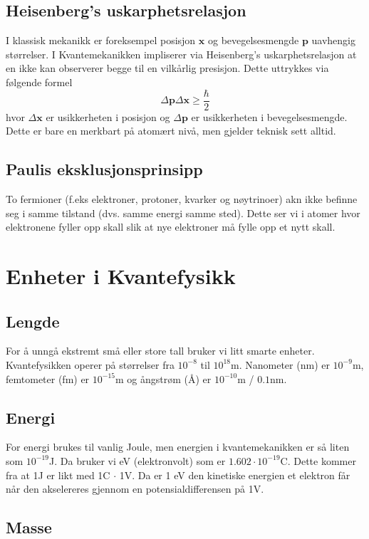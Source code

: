 \subsection{Heisenberg's uskarphetsrelasjon}
I klassisk mekanikk er foreksempel posisjon $ \mathbf{x} $ og bevegelsesmengde $ \mathbf{p} $ uavhengig størrelser. I Kvantemekanikken impliserer via Heisenberg's uskarphetsrelasjon at en ikke kan observerer begge til en vilkårlig presisjon. Dette uttrykkes via følgende formel
\[
Δ \mathbf{p} Δ\mathbf{x} \geq \frac{ℏ}{2}
\]
hvor $ Δ\mathbf{x} $ er usikkerheten i posisjon og $ Δ\mathbf{p} 
$ er usikkerheten i bevegelsesmengde. Dette er bare en merkbart på atomært nivå, men gjelder teknisk sett alltid. 

\subsection{Paulis eksklusjonsprinsipp}
To fermioner (f.eks elektroner, protoner, kvarker og nøytrinoer) akn ikke befinne seg i samme tilstand (dvs. samme energi samme sted). Dette ser vi i atomer hvor elektronene fyller opp skall slik at nye elektroner må fylle opp et nytt skall. 



\section{Enheter i Kvantefysikk}
\subsection{Lengde}
For å unngå ekstremt små eller store tall bruker vi litt smarte enheter. Kvantefysikken operer på størrelser fra $ 10^{-8} $ til $ 10^{18} $m. Nanometer (nm) er $ 10^{-9} $m, femtometer (fm) er $ 10^{-15} $m og ångstrøm (Å) er $ 10^{-10} $m / $ 0.1 $nm.

\subsection{Energi}
For energi brukes til vanlig Joule, men energien i kvantemekanikken er så liten som $ 10^{-19} $J. Da bruker vi eV (elektronvolt) som er $ 1.602 \cdot 10^{-19} $C. Dette kommer fra at 1J er likt med 1C $\cdot$ 1V. Da er 1 eV den kinetiske energien et elektron får når den akselereres gjennom en potensialdifferensen på 1V. 

\subsection{Masse}

